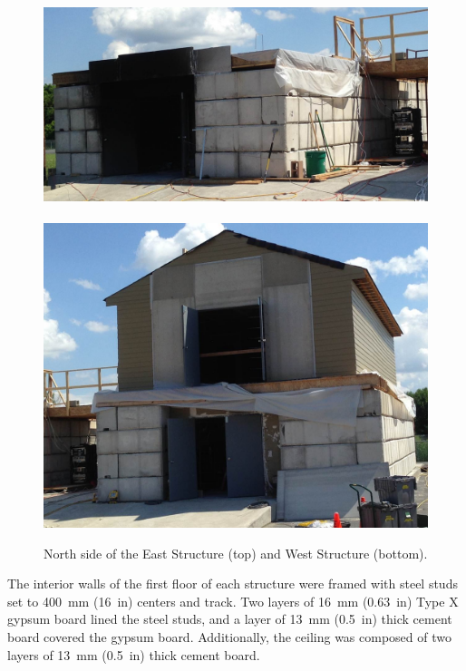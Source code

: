 \documentclass[12pt,oneside]{book}
\begin{document}
\begin{figure}[!ht]
	\includegraphics[width=5.25in]{../../Hose_Stream_Tests/Figures/Pictures/east_structure}
	\\~\\
	\includegraphics[width=5.25in]{../../Hose_Stream_Tests/Figures/Pictures/west_structure}
	\caption[North side of the East and West Structures.]{North side of the East Structure (top) and West Structure (bottom).}
	\label{fig:struct_pics}
\end{figure}

The interior walls of the first floor of each structure were framed with steel studs set to 400~mm (16~in) centers and track. Two layers of 16~mm (0.63~in) Type X gypsum board lined the steel studs, and a layer of 13~mm (0.5~in) thick cement board covered the gypsum board. Additionally, the ceiling was composed of two layers of 13~mm (0.5~in) thick cement board.
\FloatBarrier
\end{document}
